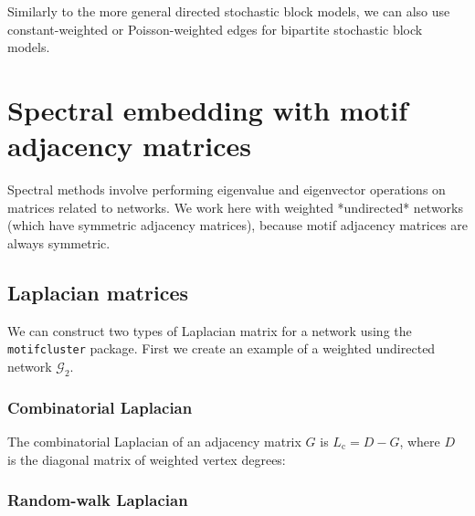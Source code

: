\documentclass{article}
\begin{document}
Similarly to the more general directed stochastic block models,
we can also use constant-weighted or Poisson-weighted edges for bipartite
stochastic block models.

\begin{pyconsole}
\end{pyconsole}




\section{Spectral embedding with motif adjacency matrices}

Spectral methods involve performing eigenvalue and
eigenvector operations on matrices related to networks.
We work here with weighted *undirected* networks
(which have symmetric adjacency matrices),
because motif adjacency matrices are always symmetric.

\subsection{Laplacian matrices}

We can construct two types of Laplacian matrix for a network
using the \texttt{motifcluster} package.
First we create an example of a weighted undirected network $\mathcal{G}_2$.

\pagebreak

\begin{pyconsole}
\end{pyconsole}

\subsubsection{Combinatorial Laplacian}

The combinatorial Laplacian of an adjacency matrix $G$ is
$L_\mathrm{c} = D - G$,
where $D$ is the diagonal matrix of weighted vertex degrees:

\begin{pyconsole}
\end{pyconsole}

\subsubsection{Random-walk Laplacian}
\end{document}
